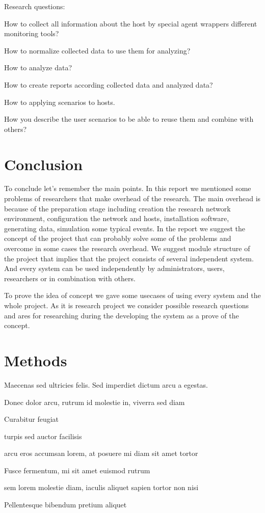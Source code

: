 \documentclass[twoside]{article}
\begin{document}
Research questions:
\begin{compactitem}
\item How to collect all information about the host by special agent wrappers different monitoring tools?  
\item How to normalize collected data to use them for analyzing?  
\item How to analyze data?
\item How to create reports according collected data and analyzed data? 
\item How to applying scenarios to hosts. 
\item How you describe the user scenarios to be able to reuse them and combine with others?
\end{compactitem}

\section{Conclusion}

To conclude let's remember the main points. In this report we mentioned some problems of researchers that make overhead of the research. The main overhead is because of the preparation stage including creation the research network environment, configuration the network and hosts, installation software, generating data, simulation some typical events. In the report we suggest the concept of the project that can probably solve some of the problems and overcome in some cases the research overhead. We suggest module structure of the project that implies that the project consists of several independent system. And every system can be used independently by administrators, users, researchers or in combination with others.     

To prove the idea of concept we gave some usecases of using every system and the whole project. As it is research project we consider possible research questions and ares for researching during the developing the system as a prove of the concept. 

\section{Methods}

Maecenas sed ultricies felis. Sed imperdiet dictum arcu a egestas. 
\begin{compactitem}
\item Donec dolor arcu, rutrum id molestie in, viverra sed diam
\item Curabitur feugiat
\item turpis sed auctor facilisis
\item arcu eros accumsan lorem, at posuere mi diam sit amet tortor
\item Fusce fermentum, mi sit amet euismod rutrum
\item sem lorem molestie diam, iaculis aliquet sapien tortor non nisi
\item Pellentesque bibendum pretium aliquet
\end{compactitem}
\lipsum[4] %
\end{document}
